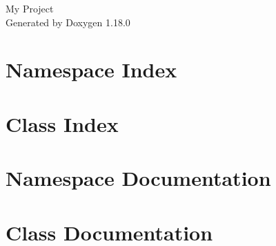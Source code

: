 \documentclass[twoside]{book}
\newcommand{\+}{\discretionary{\mbox{\scriptsize$\hookleftarrow$}}{}{}}
\newcommand{\clearemptydoublepage}{%
    \newpage{\pagestyle{empty}\cleardoublepage}%
  }
\begin{document}
  \raggedbottom
    \hypersetup{pageanchor=false,
                bookmarksnumbered=true,
                pdfencoding=unicode
               }
  \begin{titlepage}
  \vspace*{7cm}
  \begin{center}%
  {\Large My Project}\\
  \vspace*{1cm}
  {\large Generated by Doxygen 1.18.0}\\
  \end{center}
  \end{titlepage}
  \clearemptydoublepage
  \tableofcontents
  \clearemptydoublepage
  \hypersetup{pageanchor=true}
\chapter{Namespace Index}

\chapter{Class Index}

\chapter{Namespace Documentation}


\chapter{Class Documentation}



  \backmatter
  \newpage
  \clearemptydoublepage
  \printindex
\end{document}
